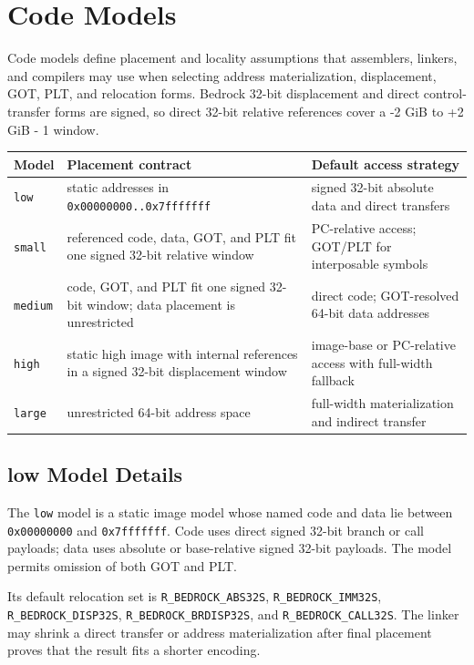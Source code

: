 \documentclass[10pt,twoside]{article}
\begin{document}
\clearpage
\section{Code Models}\label{page:code-models}
Code models define placement and locality assumptions that assemblers, linkers, and compilers may use when selecting address materialization, displacement, GOT, PLT, and relocation forms. Bedrock 32-bit displacement and direct control-transfer forms are signed, so direct 32-bit relative references cover a -2 GiB to +2 GiB - 1 window.
\begingroup\footnotesize
\setlength{\tabcolsep}{2pt}
\begin{longtable}{@{}p{0.65in}p{2.25in}p{2.60in}@{}}
\toprule
\textbf{Model} & \textbf{Placement contract} & \textbf{Default access strategy}\\
\midrule
\endhead
\texttt{low} & static addresses in \texttt{0x00000000..0x7fffffff} & signed 32-bit absolute data and direct transfers\\
\texttt{small} & referenced code, data, GOT, and PLT fit one signed 32-bit relative window & PC-relative access; GOT/PLT for interposable symbols\\
\texttt{medium} & code, GOT, and PLT fit one signed 32-bit window; data placement is unrestricted & direct code; GOT-resolved 64-bit data addresses\\
\texttt{high} & static high image with internal references in a signed 32-bit displacement window & image-base or PC-relative access with full-width fallback\\
\texttt{large} & unrestricted 64-bit address space & full-width materialization and indirect transfer\\
\bottomrule
\end{longtable}
\endgroup
\subsection{low Model Details}
The \texttt{low} model is a static image model whose named code and data lie
between \texttt{0x00000000} and \texttt{0x7fffffff}. Code uses direct signed
32-bit branch or call payloads; data uses absolute or base-relative signed
32-bit payloads. The model permits omission of both GOT and PLT.

Its default relocation set is \texttt{R\_BEDROCK\_ABS32S},
\texttt{R\_BEDROCK\_IMM32S}, \texttt{R\_BEDROCK\_DISP32S},
\texttt{R\_BEDROCK\_BRDISP32S}, and \texttt{R\_BEDROCK\_CALL32S}. The linker
may shrink a direct transfer or address materialization after final placement
proves that the result fits a shorter encoding.
\end{document}
